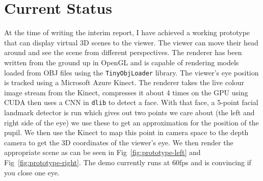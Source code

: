 \section{Current Status}
At the time of writing the interim report, I have achieved a working prototype that can display virtual 3D scenes to the viewer. The viewer can move their head around and see the scene from different perspectives. The renderer has been written from the ground up in OpenGL and is capable of rendering models loaded from OBJ files using the \texttt{TinyObjLoader} library. The viewer's eye position is tracked using a Microsoft Azure Kinect. The renderer takes the live colour image stream from the Kinect, compresses it about 4 times on the GPU using CUDA then uses a CNN in \texttt{dlib} to detect a face. With that face, a 5-point facial landmark detector is run which gives out two points we care about (the left and right side of the eye) we use these to get an approximation for the position of the pupil. We then use the Kinect to map this point in camera space to the depth camera to get the 3D coordinates of the viewer's eye. We then render the appropriate scene as can be seen in Fig~\ref{fig:prototype-left} and Fig~\ref{fig:prototype-right}. The demo currently runs at 60fps and is convincing if you close one eye.

